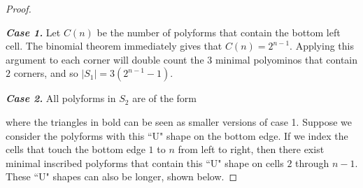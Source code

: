\documentclass[12pt]{article}
\theoremstyle{plain}
\theoremstyle{definition}
\theoremstyle{remark}
\theoremstyle{definition}
\newcommand{\createtri}[6]{\filldraw[gray!40] ( #1 , #2 ) -- ( #3 , #4 ) -- ( #5 , #6 ) -- cycle; \draw[thick] ( #1 , #2 ) -- ( #3 , #4 ) -- ( #5 , #6 ) -- cycle;}
\begin{document}
\begin{proof}
\begin{center}
\begin{minipage}{0.25\textwidth}
    \end{minipage}\hfill
\end{center}

\textbf{\textit{Case 1.}} Let $C(n)$ be the number of polyforms that contain the bottom left cell. The binomial theorem immediately gives that $C(n) = 2^{n-1}$. Applying this argument to each corner will double count the $3$ minimal polyominos that contain $2$ corners, and so $|S_1| = 3(2^{n-1} - 1)$.

\textbf{\textit{Case 2.}} All polyforms in $S_2$ are of the form 

\begin{center}
\end{center}

\noindent where the triangles in bold can be seen as smaller versions of case 1. Suppose we consider the polyforms with this ``U" shape on the bottom edge. If we index the cells that touch the bottom edge $1$ to $n$ from left to right, then there exist minimal inscribed polyforms that contain this ``U" shape on cells $2$ through $n-1$. These ``U" shapes can also be longer, shown below.


\end{proof}
\end{document}
